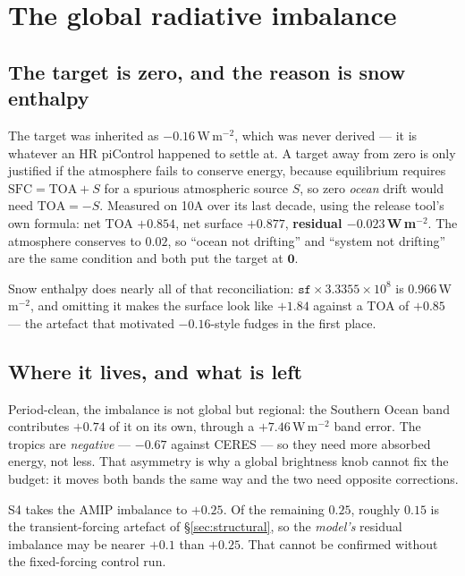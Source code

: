 \documentclass[10pt]{article}
\begin{document}
\section{The global radiative imbalance}\label{sec:rad}

\subsection{The target is zero, and the reason is snow enthalpy}
The target was inherited as $-0.16$\,W\,m$^{-2}$, which was never derived --- it is
whatever an HR piControl happened to settle at. A target away from zero is only justified
if the atmosphere fails to conserve energy, because equilibrium requires
$\mathrm{SFC}=\mathrm{TOA}+S$ for a spurious atmospheric source $S$, so zero \emph{ocean}
drift would need $\mathrm{TOA}=-S$. Measured on 10A over its last decade, using the release
tool's own formula: net TOA $+0.854$, net surface $+0.877$, \textbf{residual
$-0.023$\,W\,m$^{-2}$}. The atmosphere conserves to $0.02$, so ``ocean not drifting'' and
``system not drifting'' are the same condition and both put the target at $\mathbf{0}$.

Snow enthalpy does nearly all of that reconciliation: $\mathtt{sf}\times3.3355\times10^{8}$
is $0.966$\,W\,m$^{-2}$, and omitting it makes the surface look like $+1.84$ against a TOA
of $+0.85$ --- the artefact that motivated $-0.16$-style fudges in the first place.

\subsection{Where it lives, and what is left}
Period-clean, the imbalance is not global but regional: the Southern Ocean band contributes
$+0.74$ of it on its own, through a $+7.46$\,W\,m$^{-2}$ band error. The tropics are
\emph{negative} --- $-0.67$ against CERES --- so they need more absorbed energy, not less.
That asymmetry is why a global brightness knob cannot fix the budget: it moves both bands
the same way and the two need opposite corrections.

S4 takes the AMIP imbalance to $+0.25$. Of the remaining $0.25$, roughly $0.15$ is the
transient-forcing artefact of \S\ref{sec:structural}, so the \emph{model's} residual
imbalance may be nearer $+0.1$ than $+0.25$. That cannot be confirmed without the
fixed-forcing control run.

\end{document}
